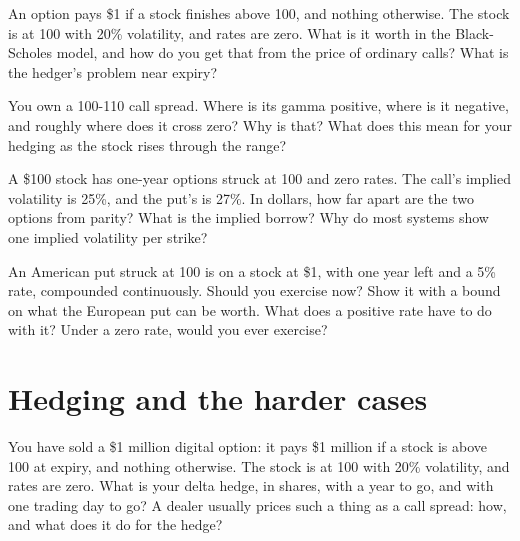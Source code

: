 \begin{question}\label{iq:iv2:options-parity-and-greeks:31}
An option pays \$1 if a stock finishes above 100, and nothing otherwise. The stock is at 100 with 20\% volatility, and rates are zero. What is it worth in the Black-Scholes model, and how do you get that from the price of ordinary calls? What is the hedger's problem near expiry?
\end{question}

\begin{question}\label{iq:iv2:options-parity-and-greeks:32}
You own a 100-110 call spread. Where is its gamma positive, where is it negative, and roughly where does it cross zero? Why is that? What does this mean for your hedging as the stock rises through the range?
\end{question}

\begin{question}\label{iq:iv2:options-parity-and-greeks:33}
A \$100 stock has one-year options struck at 100 and zero rates. The call's implied volatility is 25\%, and the put's is 27\%. In dollars, how far apart are the two options from parity? What is the implied borrow? Why do most systems show one implied volatility per strike?
\end{question}

\begin{question}\label{iq:iv2:options-parity-and-greeks:34}
An American put struck at 100 is on a stock at \$1, with one year left and a 5\% rate, compounded continuously. Should you exercise now? Show it with a bound on what the European put can be worth. What does a positive rate have to do with it? Under a zero rate, would you ever exercise?
\end{question}

\section{Hedging and the harder cases}

\begin{question}\label{iq:iv2:options-parity-and-greeks:35}
You have sold a \$1 million digital option: it pays \$1 million if a stock is above 100 at expiry, and nothing otherwise. The stock is at 100 with 20\% volatility, and rates are zero. What is your delta hedge, in shares, with a year to go, and with one trading day to go? A dealer usually prices such a thing as a call spread: how, and what does it do for the hedge?
\end{question}

